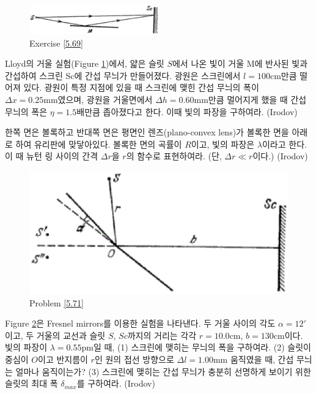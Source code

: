 \begin{figure}[h]
\centering
\includegraphics[width=0.5\textwidth]{Pictures/5.69.eps}
\caption{Exercise \ref{5.69}}
\label{fig:5.69}
\end{figure}
\begin{exercise}\label{5.69}
Lloyd의 거울 실험(Figure \ref{fig:5.69})에서, 얇은 슬릿 $S$에서 나온 빛이 거울 M에 반사된 빛과 간섭하여 스크린 Sc에 간섭 무늬가 만들어졌다. 광원은 스크린에서 $l = 100 \mathrm{cm}$만큼 떨어져 있다. 광원이 특정 지점에 있을 때 스크린에 맺힌 간섭 무늬의 폭이 $\Delta x=0.25\mathrm{mm}$였으며, 광원을 거울면에서 $\Delta h =0.60\mathrm{mm}$만큼 멀어지게 했을 때 간섭무늬의 폭은  $\eta = 1.5$배만큼 좁아졌다고 한다. 이때 빛의 파장을 구하여라. (Irodov)
\end{exercise}

\begin{problem}
한쪽 면은 볼록하고 반대쪽 면은 평면인 렌즈(plano-convex lens)가 볼록한 면을 아래로 하여 유리판에 맞닿아있다. 볼록한 면의 곡률이 $R$이고, 빛의 파장은 $\lambda$이라고 한다. 이 때 뉴턴 링 사이의 간격 $\Delta r$을 $r$의 함수로 표현하여라. (단, $\Delta r \ll r$이다.) (Irodov)
\end{problem}

\begin{problem}\label{5.71}
\begin{figure}[h]
\centering
\includegraphics[scale=0.5]{Pictures/5.71.eps}
\caption{Problem \ref{5.71}}
\label{fig:5.71}
\end{figure}
Figure \ref{fig:5.71}은 Fresnel mirrors를 이용한 실험을 나타낸다. 두 거울 사이의 각도 $\alpha = 12'$이고, 두 거울의 교선과 슬릿 $S$, $Sc$까지의 거리는 각각 $r=10.0\mathrm{cm}$, $b=130\mathrm{cm}$이다. 빛의 파장이 $\lambda = 0.55\mathrm{pm}$일 때, (1) 스크린에 맺히는 무늬의 폭을 구하여라. (2) 슬릿이 중심이 $O$이고 반지름이 $r$인 원의 접선 방향으로 $\Delta l=1.00\mathrm{mm}$ 움직였을 때, 간섭 무늬는 얼마나 움직이는가? (3) 스크린에 맺히는 간섭 무늬가 충분히 선명하게 보이기 위한 슬릿의 최대 폭 $\delta_{max}$를 구하여라. (Irodov)
\end{problem}

